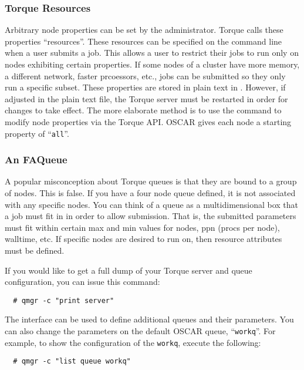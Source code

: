 \subsubsection{Torque Resources}

Arbitrary node properties can be set by the administrator.  Torque
calls these properties ``resources''.  These resources can be
specified on the  command line when a user submits a job.
This allows a user to restrict their jobs to run only on nodes
exhibiting certain properties.  If some nodes of a cluster have more
memory, a different network, faster prcoessors, etc., jobs can be
submitted so they only run a specific subset.  These properties are
stored in plain text in .
However, if adjusted in the plain text file, the Torque server must
be restarted in order for changes to take effect.  The more
elaborate method is to use the  command to modify node
properties via the Torque API.  OSCAR gives each node a starting
property of ``{\tt all}''.

\subsubsection{An FAQueue}

A popular misconception about Torque queues is that they are bound
to a group of nodes.  This is false.  If you have a four node queue
defined, it is not associated with any specific nodes.  You can
think of a queue as a multidimensional box that a job must fit in in
order to allow submission.  That is, the submitted parameters must
fit within certain max and min values for nodes, ppn (procs per
node), walltime, etc.  If specific nodes are desired to run on, then
resource attributes must be defined.

If you would like to get a full dump of your Torque server and queue
configuration, you can issue this command:

\begin{verbatim}
  # qmgr -c "print server"
\end{verbatim}

The  interface can be used to define additional queues and
their parameters.  You can also change the parameters on the default
OSCAR queue, ``{\tt workq}''.  For example, to show the configuration
of the {\tt workq}, execute the following:

\begin{verbatim}
  # qmgr -c "list queue workq"
\end{verbatim}

